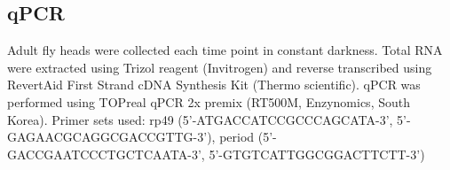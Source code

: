 \subsection*{qPCR}

Adult fly heads were collected each time point in constant darkness.
Total RNA were extracted using Trizol reagent (Invitrogen) and reverse transcribed using RevertAid First Strand cDNA Synthesis Kit (Thermo scientific).
qPCR was performed using TOPreal qPCR 2x premix (RT500M, Enzynomics, South Korea).
Primer sets used: rp49 (5'-ATGACCATCCGCCCAGCATA-3', 5'-GAGAACGCAGGCGACCGTTG-3'), period (5'-GACCGAATCCCTGCTCAATA-3', 5'-GTGTCATTGGCGGACTTCTT-3') 